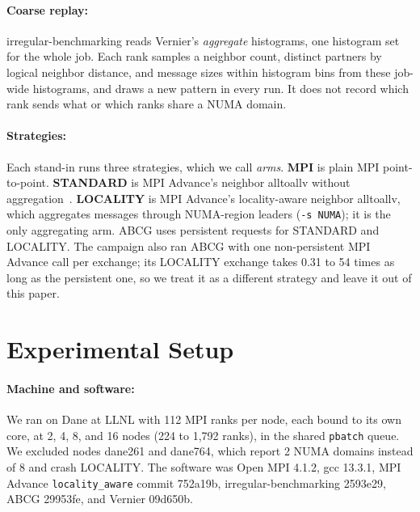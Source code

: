 \documentclass[11pt]{article}
\begin{document}
\paragraph{Coarse replay:} irregular-benchmarking reads Vernier's \emph{aggregate}
histograms, one histogram set for the whole job. Each rank samples a neighbor count,
distinct partners by logical neighbor distance, and message sizes within histogram bins
from these job-wide histograms, and draws a new pattern in every run. It does not
record which rank sends what or which ranks share a NUMA domain.

\paragraph{Strategies:} Each stand-in runs three strategies, which we call
\emph{arms}. \textbf{MPI} is plain MPI point-to-point. \textbf{STANDARD} is MPI
Advance's neighbor alltoallv without aggregation~\cite{mpiadvance2023}.
\textbf{LOCALITY} is MPI Advance's locality-aware neighbor alltoallv, which aggregates
messages through NUMA-region leaders (\texttt{-s NUMA}); it is the only aggregating arm.
ABCG uses persistent requests for STANDARD and LOCALITY. The campaign also ran ABCG with
one non-persistent MPI Advance call per exchange; its LOCALITY exchange takes 0.31 to 54
times as long as the persistent one, so we treat it as a different strategy and leave it
out of this paper.

\section{Experimental Setup}
\label{sec:setup}

\paragraph{Machine and software:} We ran on Dane at LLNL with 112 MPI ranks per node,
each bound to its own core, at 2, 4, 8, and 16 nodes (224 to 1,792 ranks), in the
shared \texttt{pbatch} queue. We excluded nodes dane261 and dane764, which report 2 NUMA
domains instead of 8 and crash LOCALITY. The software was Open MPI 4.1.2, gcc 13.3.1,
MPI Advance \texttt{locality\_aware} commit 752a19b, irregular-benchmarking 2593e29,
ABCG 29953fe, and Vernier 09d650b.
\end{document}
